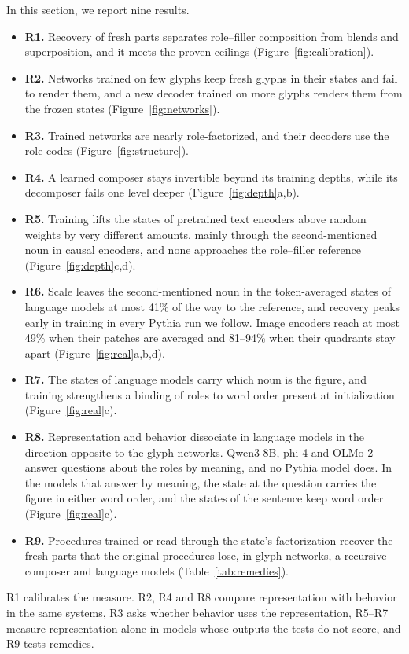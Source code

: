 \documentclass[10pt]{article}
\theoremstyle{plain}
\theoremstyle{remark}
\begin{document}
In this section, we report nine results.
\begin{itemize}
  \item \textbf{R1.} Recovery of fresh parts separates role--filler composition from blends and superposition, and it meets the proven ceilings (Figure~\ref{fig:calibration}).
  \item \textbf{R2.} Networks trained on few glyphs keep fresh glyphs in their states and fail to render them, and a new decoder trained on more glyphs renders them from the frozen states (Figure~\ref{fig:networks}).
  \item \textbf{R3.} Trained networks are nearly role-factorized, and their decoders use the role codes (Figure~\ref{fig:structure}).
  \item \textbf{R4.} A learned composer stays invertible beyond its training depths, while its decomposer fails one level deeper (Figure~\ref{fig:depth}a,b).
  \item \textbf{R5.} Training lifts the states of pretrained text encoders above random weights by very different amounts, mainly through the second-mentioned noun in causal encoders, and none approaches the role--filler reference (Figure~\ref{fig:depth}c,d).
  \item \textbf{R6.} Scale leaves the second-mentioned noun in the token-averaged states of language models at most 41\% of the way to the reference, and recovery peaks early in training in every Pythia run we follow. Image encoders reach at most 49\% when their patches are averaged and 81--94\% when their quadrants stay apart (Figure~\ref{fig:real}a,b,d).
  \item \textbf{R7.} The states of language models carry which noun is the figure, and training strengthens a binding of roles to word order present at initialization (Figure~\ref{fig:real}c).
  \item \textbf{R8.} Representation and behavior dissociate in language models in the direction opposite to the glyph networks. Qwen3-8B, phi-4 and OLMo-2 answer questions about the roles by meaning, and no Pythia model does. In the models that answer by meaning, the state at the question carries the figure in either word order, and the states of the sentence keep word order (Figure~\ref{fig:real}c).
  \item \textbf{R9.} Procedures trained or read through the state's factorization recover the fresh parts that the original procedures lose, in glyph networks, a recursive composer and language models (Table~\ref{tab:remedies}).
\end{itemize}
R1 calibrates the measure. R2, R4 and R8 compare representation with behavior in the same systems, R3 asks whether behavior uses the representation, R5--R7 measure representation alone in models whose outputs the tests do not score, and R9 tests remedies.
\end{document}
